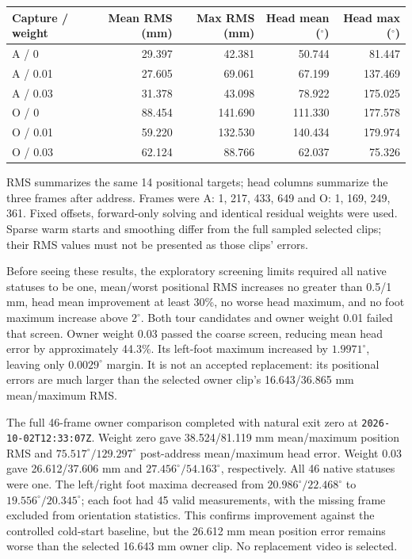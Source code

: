 \documentclass[11pt,a4paper]{article}
\begin{document}
\begin{center}
\begin{tabular}{lrrrr}
\toprule
Capture / weight & Mean RMS (mm) & Max RMS (mm) & Head mean ($^\circ$) & Head max ($^\circ$) \\
\midrule
A / 0 & 29.397 & 42.381 & 50.744 & 81.447 \\
A / 0.01 & 27.605 & 69.061 & 67.199 & 137.469 \\
A / 0.03 & 31.378 & 43.098 & 78.922 & 175.025 \\
O / 0 & 88.454 & 141.690 & 111.330 & 177.578 \\
O / 0.01 & 59.220 & 132.530 & 140.434 & 179.974 \\
O / 0.03 & 62.124 & 88.766 & 62.037 & 75.326 \\
\bottomrule
\end{tabular}
\end{center}
RMS summarizes the same 14 positional targets; head columns summarize the
three frames after address. Frames were A: 1, 217, 433, 649 and O: 1, 169,
249, 361. Fixed offsets, forward-only solving and identical residual weights
were used. Sparse warm starts and smoothing differ from the full sampled
selected clips; their RMS values must not be presented as those clips' errors.

Before seeing these results, the exploratory screening limits required all
native statuses to be one, mean/worst positional RMS increases no greater
than 0.5/1 mm, head mean improvement at least 30\%, no worse head maximum,
and no foot maximum increase above $2^\circ$. Both tour candidates and
owner weight 0.01 failed that screen. Owner weight 0.03 passed the coarse
screen, reducing mean head error by approximately 44.3\%. Its left-foot
maximum increased by $1.9971^\circ$, leaving only $0.0029^\circ$ margin.
It is not an accepted replacement: its positional errors are much larger
than the selected owner clip's 16.643/36.865 mm mean/maximum RMS.

The full 46-frame owner comparison completed with natural exit zero at
\texttt{2026-10-02T12:33:07Z}. Weight zero gave 38.524/81.119 mm mean/maximum
position RMS and $75.517^\circ/129.297^\circ$ post-address mean/maximum head
error. Weight 0.03 gave 26.612/37.606 mm and
$27.456^\circ/54.163^\circ$, respectively. All 46 native statuses were one.
The left/right foot maxima decreased from $20.986^\circ/22.468^\circ$ to
$19.556^\circ/20.345^\circ$; each foot had 45 valid measurements, with the
missing frame excluded from orientation statistics. This confirms improvement
against the controlled cold-start baseline, but the 26.612 mm mean position
error remains worse than the selected 16.643 mm owner clip. No replacement
video is selected.
\end{document}
